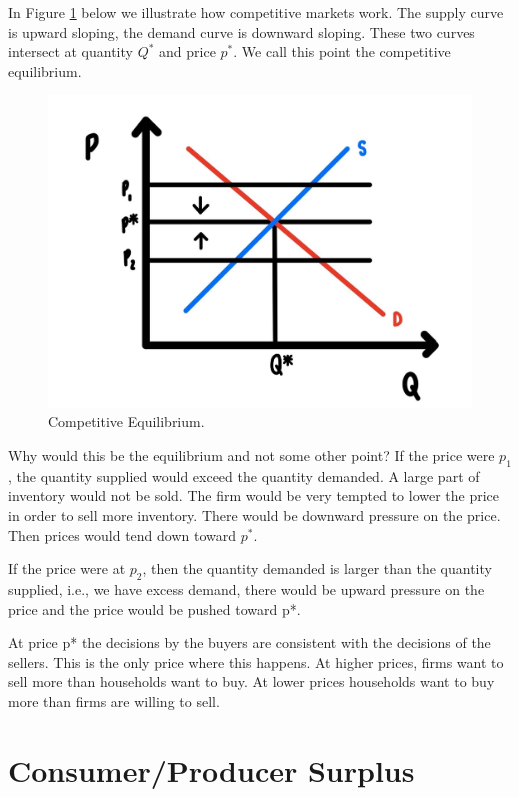 \documentclass[
]{book}
\begin{document}
In Figure \ref{fig:compmarkets01} below we illustrate how competitive markets work. The supply curve is upward sloping, the demand curve is downward sloping. These two curves intersect at quantity \(Q^*\) and price \(p^*\). We call this point the competitive equilibrium.

\begin{figure}

{\centering \includegraphics[width=0.75\linewidth]{img/compmarkets/fig1} 

}

\caption{Competitive Equilibrium.}\label{fig:compmarkets01}
\end{figure}

Why would this be the equilibrium and not some other point? If the price were \(p_1\), the quantity supplied would exceed the quantity demanded. A large part of inventory would not be sold. The firm would be very tempted to lower the price in order to sell more inventory. There would be downward pressure on the price. Then prices would tend down toward \(p^*\).

If the price were at \(p_2\), then the quantity demanded is larger than the quantity supplied, i.e., we have excess demand, there would be upward pressure on the price and the price would be pushed toward p*.

At price p* the decisions by the buyers are consistent with the decisions of the sellers. This is the only price where this happens. At higher prices, firms want to sell more than households want to buy. At lower prices households want to buy more than firms are willing to sell.

\hypertarget{consumerproducer-surplus}{%
\section{Consumer/Producer Surplus}\label{consumerproducer-surplus}}
\end{document}
